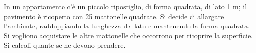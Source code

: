 In un appartamento c'è un piccolo ripostiglio, 
di forma quadrata, di lato 1 m; 
il pavimento è ricoperto con 25 mattonelle quadrate. 
Si decide di allargare l'ambiente, raddoppiando la lunghezza del lato 
e mantenendo la forma quadrata. Si vogliono acquistare le altre 
mattonelle che occorrono per ricoprire la superficie. 
Si calcoli quante se ne devono prendere.

